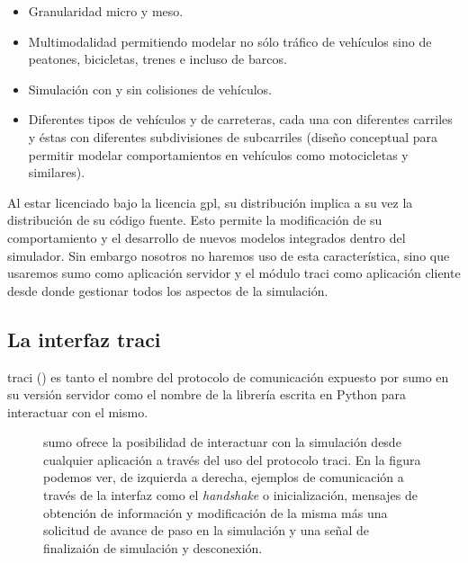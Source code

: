 \begin{itemize}
	\item Granularidad micro y meso.
	\item Multimodalidad permitiendo modelar no sólo tráfico de vehículos sino de peatones, bicicletas, trenes e incluso de barcos.
	\item Simulación con y sin colisiones de vehículos.
	\item Diferentes tipos de vehículos y de carreteras, cada una con diferentes carriles y éstas con diferentes subdivisiones de subcarriles (diseño conceptual para permitir modelar comportamientos en vehículos como motocicletas y similares).
\end{itemize}

Al estar licenciado bajo la licencia \gls{gpl}, su distribución implica a su vez la distribución de su código fuente. Esto permite la modificación de su comportamiento y el desarrollo de nuevos modelos integrados dentro del simulador. Sin embargo nosotros no haremos uso de esta característica, sino que usaremos \gls{sumo} como aplicación servidor y el módulo \gls{traci} como aplicación cliente desde donde gestionar todos los aspectos de la simulación.

\subsection{La interfaz \gls{traci}}

\gls{traci} (\cite{Wegener2008}) es tanto el nombre del protocolo de comunicación expuesto por \gls{sumo} en su versión servidor como el nombre de la librería escrita en Python para interactuar con el mismo.

\begin{figure}
	\centering
	\caption{\gls{sumo} ofrece la posibilidad de interactuar con la simulación desde cualquier aplicación a través del uso del protocolo \gls{traci}. En la figura podemos ver, de izquierda a derecha, ejemplos de comunicación a través de la interfaz como el \textit{handshake} o inicialización, mensajes de obtención de información y modificación de la misma más una solicitud de avance de paso en la simulación y una señal de finalizaión de simulación y desconexión.}
	\label{fig:traci-messages}
\end{figure}

